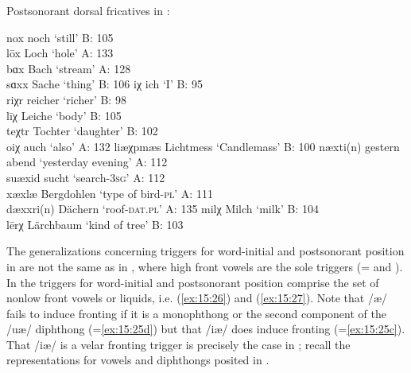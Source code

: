 {
\ex%
\label{ex:15:25}Postsonorant dorsal fricatives in :

\ea nox  \tab  [nox] \tab noch \tab ‘still’ \tab B: 105\\\label{ex:15:25a}
    lōx  \tab  [loːx] \tab Loch \tab ‘hole’ \tab A: 133\\
    bɑx  \tab  [bɑx] \tab Bach \tab ‘stream’ \tab A: 128\\
    sɑxx \tab [sɑxx] \tab Sache \tab ‘thing’ \tab B: 106
\ex iχ  \tab  [iç] \tab ich \tab ‘I’ \tab B: 95\\\label{ex:15:25b}
    riχr  \tab  [riçr̩] \tab reicher \tab ‘richer’ \tab B: 98\\
    līχ  \tab  [liːç] \tab Leiche \tab ‘body’ \tab B: 105\\
    teχtr \tab [teçtr̩] \tab Tochter \tab ‘daughter’ \tab B: 102\\
    oiχ  \tab  [oiç] \tab auch \tab ‘also’ \tab A: 132
\ex liæχpmæs \tab [liæçpmas] \tab Lichtmess \tab ‘Candlemass’ \tab B: 100\label{ex:15:25c}
\ex næxti(n) \tab [næxti(n)] \tab gestern abend \tab ‘yesterday evening’ \tab A: 112\\\label{ex:15:25d}
    suæxid \tab [suæxid] \tab sucht \tab ‘search-\textsc{3}\textsc{sg}’ \tab A: 112\\
    xæxlæ \tab [xæxlæ] \tab Bergdohlen \tab ‘type of bird-\textsc{pl}’ \tab A: 111\\
    dæxxri(n) \tab [dæxxxri(n)] \tab Dächern \tab ‘roof-\textsc{dat}.\textsc{pl}’ \tab A: 135
\ex milχ \tab [milç] \tab Milch \tab ‘milk’ \tab B: 104\\\label{ex:15:25e}
    lērχ  \tab  [leːrç] \tab Lärchbaum \tab ‘kind of tree’ \tab B: 103
\z 
\z 

The generalizations concerning triggers for word-initial and postsonorant position in  are not the same as in , where high front vowels are the sole triggers (= and ). In  the triggers for word-initial and postsonorant position comprise the set of nonlow front vowels or liquids, i.e. (\ref{ex:15:26}) and (\ref{ex:15:27}). Note that /æ/ fails to induce fronting if it is a monophthong or the second component of the /uæ/ diphthong (=\ref{ex:15:25d}) but that /iæ/ does induce fronting (=\ref{ex:15:25c}). That /iæ/ is a velar fronting trigger is precisely the case in ; recall the representations for vowels and diphthongs posited in .

}
